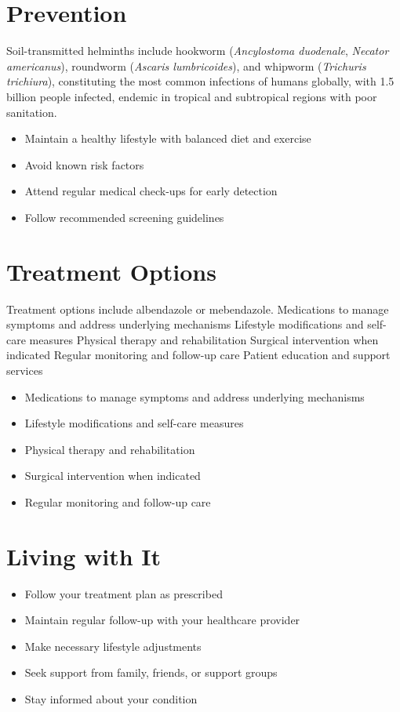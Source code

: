 \section{Prevention}
Soil-transmitted helminths include hookworm (\textit{Ancylostoma duodenale}, \textit{Necator americanus}), roundworm (\textit{Ascaris lumbricoides}), and whipworm (\textit{Trichuris trichiura}), constituting the most common infections of humans globally, with 1.5 billion people infected, endemic in tropical and subtropical regions with poor sanitation.

\begin{itemize}[noitemsep]
  \item Maintain a healthy lifestyle with balanced diet and exercise
  \item Avoid known risk factors
  \item Attend regular medical check-ups for early detection
  \item Follow recommended screening guidelines
\end{itemize}
\section{Treatment Options}
Treatment options include albendazole or mebendazole. Medications to manage symptoms and address underlying mechanisms Lifestyle modifications and self-care measures Physical therapy and rehabilitation Surgical intervention when indicated Regular monitoring and follow-up care Patient education and support services

\begin{itemize}[noitemsep]
  \item Medications to manage symptoms and address underlying mechanisms
  \item Lifestyle modifications and self-care measures
  \item Physical therapy and rehabilitation
  \item Surgical intervention when indicated
  \item Regular monitoring and follow-up care
\end{itemize}
\section{Living with It}
\begin{itemize}[noitemsep]
  \item Follow your treatment plan as prescribed
  \item Maintain regular follow-up with your healthcare provider
  \item Make necessary lifestyle adjustments
  \item Seek support from family, friends, or support groups
  \item Stay informed about your condition
\end{itemize}
